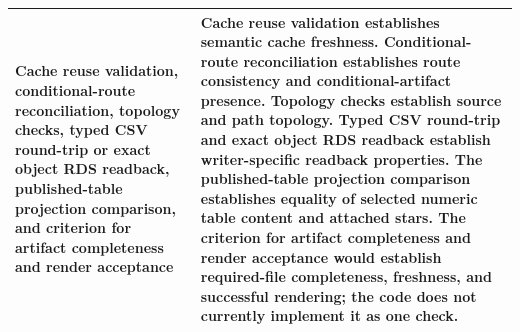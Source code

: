 \documentclass[11pt]{article}
\begin{document}
\begin{longtable}{@{}>{\raggedright\arraybackslash}p{}
  >{\raggedright\arraybackslash}p{}@{}}
Cache reuse validation, conditional-route reconciliation, topology checks,
typed CSV round-trip or exact object RDS readback, published-table projection
comparison, and criterion for artifact completeness and render acceptance &
Cache reuse validation establishes semantic cache freshness. Conditional-route
reconciliation establishes route consistency and conditional-artifact presence.
Topology checks establish source and path topology. Typed CSV round-trip and
exact object RDS readback establish writer-specific readback properties. The
published-table projection comparison establishes equality of selected numeric
table content and attached stars. The criterion for artifact completeness and
render acceptance would establish required-file completeness, freshness, and
successful rendering; the code does not currently implement it as one check.\\
\bottomrule
\end{longtable}
\normalsize
\end{document}
